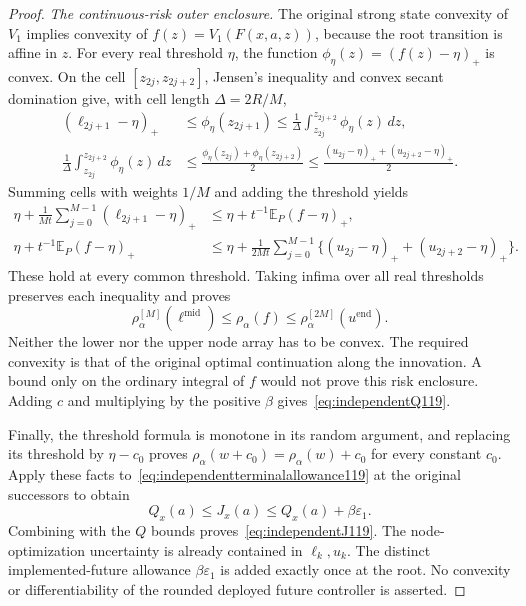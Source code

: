 \begin{proof}
\medskip\noindent
\emph{The continuous-risk outer enclosure.}
The original strong state convexity of $V_1$ implies convexity of
$f(z)=V_1(F(x,a,z))$, because the root transition is affine in $z$.
For every real threshold $\eta$, the function
$\phi_\eta(z)=(f(z)-\eta)_+$ is convex.  On the cell
$[z_{2j},z_{2j+2}]$, Jensen's inequality and convex secant domination
give, with cell length $\Delta=2R/M$,
\begin{align*}
 (\ell_{2j+1}-\eta)_+
 &\le\phi_\eta(z_{2j+1})
 \le\frac1\Delta\int_{z_{2j}}^{z_{2j+2}}\phi_\eta(z)\,dz,\\
 \frac1\Delta\int_{z_{2j}}^{z_{2j+2}}\phi_\eta(z)\,dz
 &\le\frac{\phi_\eta(z_{2j})+\phi_\eta(z_{2j+2})}{2}
 \le\frac{(u_{2j}-\eta)_++(u_{2j+2}-\eta)_+}{2}.
\end{align*}
Summing cells with weights $1/M$ and adding the threshold yields
\begin{align*}
 \eta+\frac1{Mt}\sum_{j=0}^{M-1}(\ell_{2j+1}-\eta)_+
 &\le\eta+t^{-1}\mathbb E_P(f-\eta)_+,\\
 \eta+t^{-1}\mathbb E_P(f-\eta)_+
 &\le\eta+\frac1{2Mt}\sum_{j=0}^{M-1}
             \{(u_{2j}-\eta)_++(u_{2j+2}-\eta)_+\}.
\end{align*}
These hold at every common threshold.  Taking infima over all real
thresholds preserves each inequality and proves
\[
 \rho_\alpha^{[M]}(\ell^{\mathrm{mid}})
 \le\rho_\alpha(f)
 \le\rho_\alpha^{[2M]}(u^{\mathrm{end}}).
\]
Neither the lower nor the upper node array has to be convex.  The
required convexity is that of the original optimal continuation along
the innovation.  A bound only on the ordinary integral of $f$ would
not prove this risk enclosure.  Adding $c$ and multiplying by the
positive $\beta$ gives~\eqref{eq:independentQ119}.

Finally, the threshold formula is monotone in its random argument,
and replacing its threshold by $\eta-c_0$ proves
$\rho_\alpha(w+c_0)=\rho_\alpha(w)+c_0$ for every constant
$c_0$.  Apply these facts to~\eqref{eq:independentterminalallowance119}
at the original successors to obtain
\[
 Q_x(a)\le J_x(a)\le Q_x(a)+\beta\varepsilon_1.
\]
Combining with the $Q$ bounds proves~\eqref{eq:independentJ119}.
The node-optimization uncertainty is already contained in $\ell_k,u_k$.
The distinct implemented-future allowance $\beta\varepsilon_1$ is
added exactly once at the root.  No convexity or differentiability of
the rounded deployed future controller is asserted.
\end{proof}

